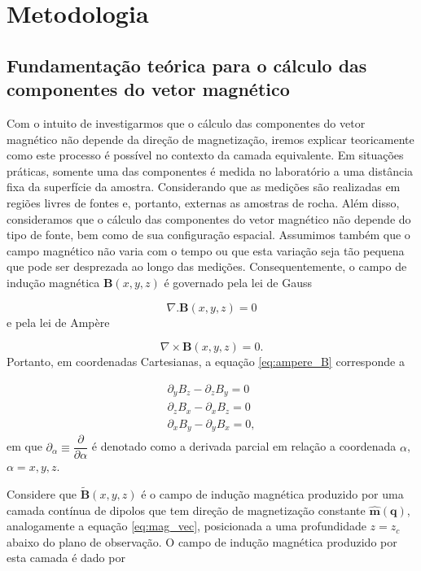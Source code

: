\chapter{Metodologia}
\label{chap:metodolodia_part2}

\section{Fundamentação teórica para o cálculo das componentes do vetor magnético}

Com o intuito de investigarmos que o cálculo das componentes do vetor magnético não depende da direção de magnetização, iremos explicar teoricamente como este processo é possível no contexto da camada equivalente. Em situações práticas, somente uma das componentes é medida no laboratório a uma distância fixa da superfície da amostra. Considerando que as medições são realizadas em regiões livres de fontes e, portanto, externas as amostras de rocha. Além disso, consideramos que o cálculo das componentes do vetor magnético não depende do tipo de fonte, bem como de sua configuração espacial. Assumimos também que o campo magnético não varia com o tempo ou que esta variação seja tão pequena que pode ser desprezada ao longo das medições. Consequentemente, o campo de indução magnética $\mathbf{B}(x,y,z)$ é governado pela lei de Gauss

\begin{equation}
\nabla . \mathbf{B} (x,y,z) = 0
\label{eq:gauss_B}
\end{equation}
e pela lei de Ampère 

\begin{equation}
\nabla \times \mathbf{B} (x,y,z) = 0.
\label{eq:ampere_B}
\end{equation}
Portanto, em coordenadas Cartesianas, a equação \ref{eq:ampere_B} corresponde a 

\begin{equation}
\begin{split}
\partial_y B_z - \partial_z B_y = 0 \\
\partial_z B_x - \partial_x B_z = 0 \\
\partial_x B_y - \partial_y B_x = 0, 
\end{split}
\label{eq:ampere_B_condicao}
\end{equation}
em que $\partial_\alpha \equiv \dfrac{\partial}{\partial \alpha}$ é denotado como a derivada parcial em relação a coordenada $\alpha$, $\alpha=x,y,z$. 

Considere que $\tilde{\mathbf{B}}(x,y,z)$ é o campo de indução magnética produzido por uma camada contínua de dipolos que tem direção de magnetização constante $\hat{\mathbf{m}} (\mathbf{q})$, analogamente a equação \ref{eq:mag_vec}, posicionada a uma profundidade $z=z_c$ abaixo do plano de observação. O campo de indução magnética produzido por esta camada é dado por 

